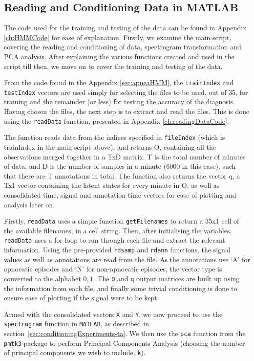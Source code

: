 \subsection{Reading and Conditioning Data in MATLAB}
\label{sec:RandCDatainMATLAB}

The code used for the training and testing of the data can be found in Appendix \ref{ch:HMMCode} for ease of explanation. Firstly, we examine the main script, covering the reading and conditioning of data, spectrogram transformation and PCA analysis. After explaining the various functions created and used in the script till then, we move on to cover the training and testing of the data.

From the code found in the Appendix \ref{sec:apneaHMM}, the \verb!trainIndex! and \verb!testIndex! vectors are used simply for selecting the files to be used, out of 35, for training and the remainder (or less) for testing the accuracy of the diagnosis. Having chosen the files, the next step is to extract and read the files. This is done using the \verb!readData! function, presented in Appendix \ref{ch:readingDataCode}.

The function reads data from the indices specified in \verb!fileIndex! (which is trainIndex in the main script above), and returns O, containing all the observations merged together in a TxD matrix. T is the total number of minutes of data, and D is the number of samples in a minute (6000 in this case), such that there are T annotations in total. The function also returns the vector q, a Tx1 vector containing the latent states for every minute in O, as well as consolidated time, signal and annotation time vectors for ease of plotting and analysis later on.

Firstly, \verb!readData! uses a simple function \verb!getFilenames! to return a 35x1 cell of the available filenames, in a cell string. Then, after initialising the variables, \verb!readData! uses a for-loop to run through each file and extract the relevant information. Using the pre-provided \verb!rdsamp! and \verb!rdann! functions, the signal values as well as annotations are read from the file. As the annotations use `A' for apnoeatic episodes and `N' for non-apnoeatic episodes, the vector type is converted to the alphabet ${0,1}$. The \verb!O! and \verb!q! output matrices are built up using the information from each file, and finally some trivial conditioning is done to ensure ease of plotting if the signal were to be kept.

Armed with the consolidated vectors \verb!X! and \verb!Y!, we now proceed to use the \verb!spectrogram! function in \verb!MATLAB!\textsuperscript{\textregistered}, as described in section~\ref{sec:conditioningExperiments-ta}. We then use the \verb!pca! function from the \verb!pmtk3! package to perform Principal Components Analysis (choosing the number of principal components we wish to include, \verb!k!). 